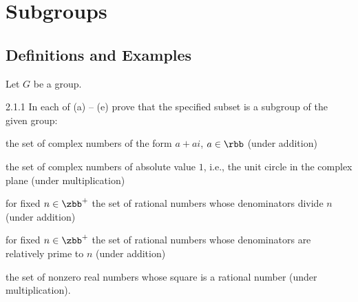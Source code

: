 \section{Subgroups}

\subsection{Definitions and Examples}

Let $G$ be a group.

\begin{exercise}{2.1.1}
    In each of (a) -- (e) prove that the specified subset is a subgroup of the given group:
    \begin{subexercises}
        \item the set of complex numbers of the form $a + ai$, $a \in \rbb$ (under addition)
        \item the set of complex numbers of absolute value $1$, i.e., the unit circle in the complex plane (under multiplication)
        \item for fixed $n \in \zbb^+$ the set of rational numbers whose denominators divide $n$ (under addition)
        \item for fixed $n \in \zbb^+$ the set of rational numbers whose denominators are relatively prime to $n$ (under addition)
        \item the set of nonzero real numbers whose square is a rational number (under multiplication).
    \end{subexercises}
\end{exercise}

